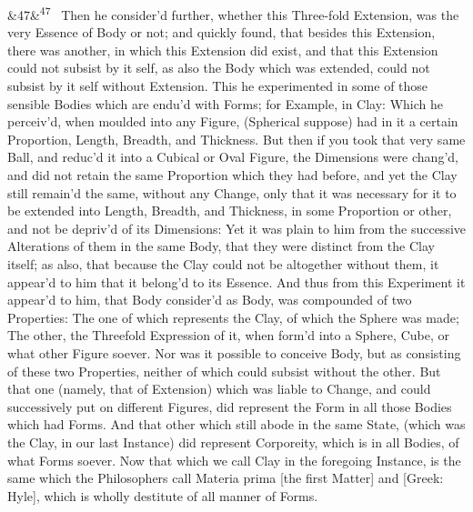 \documentclass[12pt]{article}
\newcommand{\para}[1][]{\par\noindent\ifx&#1&\else\textsuperscript{\footnotesize #1}~\fi}
\begin{document}
\para[47] Then he consider'd further, whether this Three-fold Extension, was the very Essence of Body or not; and quickly found, that besides this Extension, there was another, in which this Extension did exist, and that this Extension could not subsist by it self, as also the Body which was extended, could not subsist by it self without Extension. This he experimented in some of those sensible Bodies which are endu'd with Forms; for Example, in Clay: Which he perceiv'd, when moulded into any Figure, (Spherical suppose) had in it a certain Proportion, Length, Breadth, and Thickness. But then if you took that very same Ball, and reduc'd it into a Cubical or Oval Figure, the Dimensions were chang'd, and did not retain the same Proportion which they had before, and yet the Clay still remain'd the same, without any Change, only that it was necessary for it to be extended into Length, Breadth, and Thickness, in some Proportion or other, and not be depriv'd of its Dimensions: Yet it was plain to him from the successive Alterations of them in the same Body, that they were distinct from the Clay itself; as also, that because the Clay could not be altogether without them, it appear'd to him that it belong'd to its Essence. And thus from this Experiment it appear'd to him, that Body consider'd as Body, was compounded of two Properties: The one of which represents the Clay, of which the Sphere was made; The other, the Threefold Expression of it, when form'd into a Sphere, Cube, or what other Figure soever. Nor was it possible to conceive Body, but as consisting of these two Properties, neither of which could subsist without the other. But that one (namely, that of Extension) which was liable to Change, and could successively put on different Figures, did represent the Form in all those Bodies which had Forms. And that other which still abode in the same State, (which was the Clay, in our last Instance) did represent Corporeity, which is in all Bodies, of what Forms soever. Now that which we call Clay in the foregoing Instance, is the same which the Philosophers call Materia prima [the first Matter] and [Greek: Hyle], which is wholly destitute of all manner of Forms.
\end{document}
